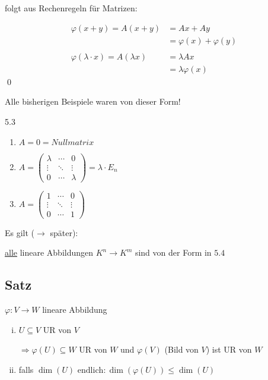 folgt aus Rechenregeln für Matrizen:

\begin{align*}
\varphi(x+y) = A(x+y) &= Ax + Ay\\
&= \varphi(x) + \varphi(y)\\
\\
\varphi(\lambda \cdot x) = A(\lambda x) &= \lambda A x\\
&= \lambda \varphi(x)
\end{align*}
\qed

Alle bisherigen Beispiele waren von dieser Form!

5.3
\begin{enumerate}
\item $A = 0 = Nullmatrix$

\item $A =
\begin{pmatrix}
\lambda & \cdots & 0\\
\vdots & \ddots & \vdots\\
0 & \cdots & \lambda
\end{pmatrix} =
\lambda \cdot E_n
$
\medskip

\item $A =
\begin{pmatrix}
1 & \cdots & 0\\
\vdots & \ddots & \vdots\\
0 & \cdots & 1
\end{pmatrix}
$ 
\end{enumerate}

Es gilt ($\rightarrow$ später):

\underline{alle} lineare Abbildungen $K^n \rightarrow K^m$ sind von der Form in $5.4$

\subsection{Satz}

$\varphi: V \rightarrow W$ lineare Abbildung

\begin{enumerate}[(i)]
	\item
	$U \subseteq V$ UR von $V$
	
	$\Rightarrow \varphi(U) \subseteq W$ UR von $W$ und $\varphi(V)$ (Bild von $V$) ist UR von $W$
	
	\item
	falls $\dim(U) {\text{ endlich}}: \dim(\varphi(U)) \leq \dim(U)$
\end{enumerate}


